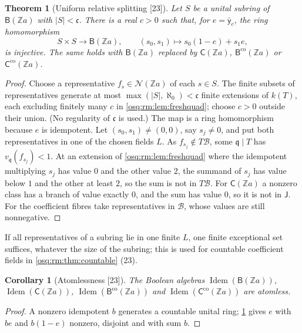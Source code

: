 \documentclass[11pt,letterpaper]{article}
\numberwithin{equation}{section}
\newtheorem{theorem}{Theorem}[section]
\newtheorem{corollary}[corollary]{Corollary}
\theoremstyle{definition}
\theoremstyle{remark}
\theoremstyle{plain}
\newcommand{\Z}{\mathbb Z}
\newcommand{\NN}{\mathcal N}         %
\newcommand{\Idem}{\operatorname{Idem}}
\newcommand{\src}[1]{\textup{\textsf{[#1]}}}
\begin{document}
\begin{theorem}[Uniform relative splitting \src{23}]\label{osq:rm:thm:uniformsplit}
Let $S$ be a unital subring of $\mathsf B(\Z a)$ with $|S|<\mathfrak c$. There is a real $c>0$ such that, for $e=\bar{\mathsf y}_c$, the ring homomorphism
\begin{equation}\label{osq:rm:eq:uniformsplit}
 S\times S\to\mathsf B(\Z a),\qquad (s_0,s_1)\mapsto s_0(1-e)+s_1e,
\end{equation}
is injective. The same holds with $\mathsf B(\Z a)$ replaced by $\mathsf C(\Z a)$, $\mathsf B^{\mathrm{co}}(\Z a)$ or $\mathsf C^{\mathrm{co}}(\Z a)$.
\end{theorem}
\begin{proof}
Choose a representative $f_s\in\NN(\Z a)$ of each $s\in S$. The finite subsets of representatives generate at most $\max(|S|,\aleph_0)<\mathfrak c$ finite
extensions of $k(T)$, each excluding finitely many $c$ in \cref{osq:rm:lem:freshquad}; choose $c>0$ outside their union. (No regularity of $\mathfrak c$ is
used.) The map is a ring homomorphism because $e$ is idempotent. Let $(s_0,s_1)\ne(0,0)$, say $s_j\ne0$, and put both representatives in one of the chosen
fields $L$. As $f_{s_j}\notin T\mathscr B$, some $\mathfrak q\mid T$ has $v_{\mathfrak q}(f_{s_j})<1$. At an extension of \cref{osq:rm:lem:freshquad} where the idempotent
multiplying $s_j$ has value $0$ and the other value $2$, the summand of $s_j$ has value below $1$ and the other at least $2$, so the sum is not in $T\mathscr B$.
For $\mathsf C(\Z a)$ a nonzero class has a branch of value exactly $0$, and the sum has value $0$, so it is not in $\mathsf J$. For the coefficient fibres take
representatives in $\mathscr B$, whose values are still nonnegative.
\end{proof}

If all representatives of a subring lie in one finite $L$, one finite exceptional set suffices, whatever the size of the subring; this is used for
countable coefficient fields in \cref{osq:rm:thm:countable} (23).

\begin{corollary}[Atomlessness \src{23}]\label{osq:rm:cor:atomless}
The Boolean algebras $\Idem(\mathsf B(\Z a))$, $\Idem(\mathsf C(\Z a))$, $\Idem(\mathsf B^{\mathrm{co}}(\Z a))$ and $\Idem(\mathsf C^{\mathrm{co}}(\Z a))$
are atomless.
\end{corollary}
\begin{proof}
A nonzero idempotent $b$ generates a countable unital ring; \cref{osq:rm:thm:uniformsplit} gives $e$ with $be$ and $b(1-e)$ nonzero, disjoint and with sum $b$.
\end{proof}
\end{document}
